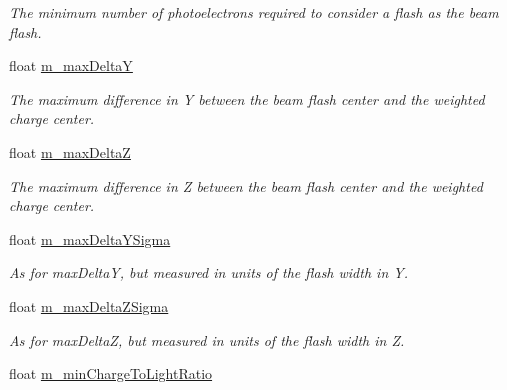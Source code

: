 \begin{DoxyCompactItemize}
\begin{DoxyCompactList}\small\item\em The minimum number of photoelectrons required to consider a flash as the beam flash. \end{DoxyCompactList}\item 
float \hyperlink{classflashmatch_1_1FlashMatchingTool_a859f9d3405d8f5bae13b3927e193ab91}{m\+\_\+max\+DeltaY}\hypertarget{classflashmatch_1_1FlashMatchingTool_a859f9d3405d8f5bae13b3927e193ab91}{}\label{classflashmatch_1_1FlashMatchingTool_a859f9d3405d8f5bae13b3927e193ab91}

\begin{DoxyCompactList}\small\item\em The maximum difference in Y between the beam flash center and the weighted charge center. \end{DoxyCompactList}\item 
float \hyperlink{classflashmatch_1_1FlashMatchingTool_a8b66b2458157a6216b83200359b6bb17}{m\+\_\+max\+DeltaZ}\hypertarget{classflashmatch_1_1FlashMatchingTool_a8b66b2458157a6216b83200359b6bb17}{}\label{classflashmatch_1_1FlashMatchingTool_a8b66b2458157a6216b83200359b6bb17}

\begin{DoxyCompactList}\small\item\em The maximum difference in Z between the beam flash center and the weighted charge center. \end{DoxyCompactList}\item 
float \hyperlink{classflashmatch_1_1FlashMatchingTool_a255b27c95bb3d2954482e3fdc8cf3e79}{m\+\_\+max\+Delta\+Y\+Sigma}\hypertarget{classflashmatch_1_1FlashMatchingTool_a255b27c95bb3d2954482e3fdc8cf3e79}{}\label{classflashmatch_1_1FlashMatchingTool_a255b27c95bb3d2954482e3fdc8cf3e79}

\begin{DoxyCompactList}\small\item\em As for max\+DeltaY, but measured in units of the flash width in Y. \end{DoxyCompactList}\item 
float \hyperlink{classflashmatch_1_1FlashMatchingTool_aa5460134c0dbb87c67ca199a0ddb67ac}{m\+\_\+max\+Delta\+Z\+Sigma}\hypertarget{classflashmatch_1_1FlashMatchingTool_aa5460134c0dbb87c67ca199a0ddb67ac}{}\label{classflashmatch_1_1FlashMatchingTool_aa5460134c0dbb87c67ca199a0ddb67ac}

\begin{DoxyCompactList}\small\item\em As for max\+DeltaZ, but measured in units of the flash width in Z. \end{DoxyCompactList}\item 
float \hyperlink{classflashmatch_1_1FlashMatchingTool_ab4b223f8fca98bb3e6372762228b3065}{m\+\_\+min\+Charge\+To\+Light\+Ratio}\hypertarget{classflashmatch_1_1FlashMatchingTool_ab4b223f8fca98bb3e6372762228b3065}{}\label{classflashmatch_1_1FlashMatchingTool_ab4b223f8fca98bb3e6372762228b3065}


\end{DoxyCompactItemize}
